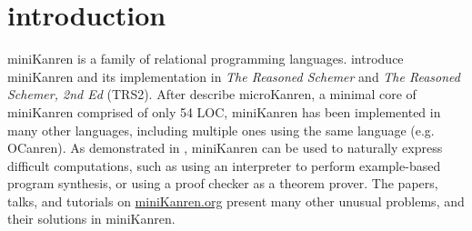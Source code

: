 \documentclass[acmlarge, review=true]{acmart}
\begin{document}
\maketitle

\section{introduction}

miniKanren is a family of relational programming languages.
\citet{Friedman:2005:RS:1121583,friedman_reasoned_2018} introduce
miniKanren and its implementation in \emph{The Reasoned Schemer} 
and \emph{The Reasoned Schemer, 2nd Ed} (TRS2). After \mbox{\citet{Hemann_2016}}
describe microKanren, a minimal core of miniKanren comprised of only 54 LOC, 
miniKanren has been implemented in many other languages, including
multiple ones using the same language (e.g. OCanren\citep{kosarev2018typed}). 
As demonstrated in \citet{byrd2017unified}, miniKanren can be used to
naturally express difficult computations, such as using an interpreter
to perform example-based program synthesis, or using a proof checker
as a theorem prover.
The papers, talks, and tutorials on \url{miniKanren.org} present many
other unusual problems, and their solutions in miniKanren.

\end{document}
